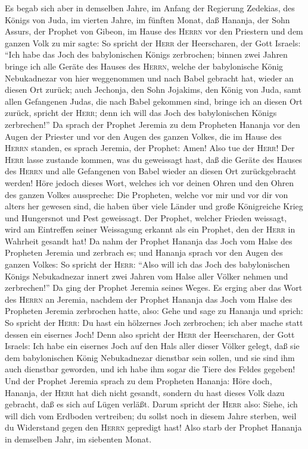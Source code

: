  Es begab sich aber in demselben Jahre, im Anfang der
Regierung Zedekias, des Königs von Juda, im vierten Jahre, im fünften
Monat, daß Hananja, der Sohn Assurs, der Prophet von Gibeon, im Hause
des \textsc{Herrn} vor den Priestern und dem ganzen Volk zu mir sagte:
 So spricht der \textsc{Herr} der Heerscharen, der Gott
Israels: ``Ich habe das Joch des babylonischen Königs zerbrochen;
 binnen zwei Jahren bringe ich alle Geräte des Hauses des
\textsc{Herrn}, welche der babylonische König Nebukadnezar von hier
weggenommen und nach Babel gebracht hat, wieder an diesen Ort zurück;
 auch Jechonja, den Sohn Jojakims, den König von Juda,
samt allen Gefangenen Judas, die nach Babel gekommen sind, bringe ich an
diesen Ort zurück, spricht der \textsc{Herr}; denn ich will das Joch des
babylonischen Königs zerbrechen!''  Da sprach der Prophet
Jeremia zu dem Propheten Hananja vor den Augen der Priester und vor den
Augen des ganzen Volkes, die im Hause des \textsc{Herrn} standen,
 es sprach Jeremia, der Prophet: Amen! Also tue der
\textsc{Herr}! Der \textsc{Herr} lasse zustande kommen, was du
geweissagt hast, daß die Geräte des Hauses des \textsc{Herrn} und alle
Gefangenen von Babel wieder an diesen Ort zurückgebracht werden!
 Höre jedoch dieses Wort, welches ich vor deinen Ohren und
den Ohren des ganzen Volkes ausspreche:  Die Propheten,
welche vor mir und vor dir von alters her gewesen sind, die haben über
viele Länder und große Königreiche Krieg und Hungersnot und Pest
geweissagt.  Der Prophet, welcher Frieden weissagt, wird
am Eintreffen seiner Weissagung erkannt als ein Prophet, den der
\textsc{Herr} in Wahrheit gesandt hat!  Da nahm der
Prophet Hananja das Joch vom Halse des Propheten Jeremia und zerbrach
es;  und Hananja sprach vor den Augen des ganzen Volkes:
So spricht der \textsc{Herr}: ``Also will ich das Joch des babylonischen
Königs Nebukadnezar innert zwei Jahren vom Halse aller Völker nehmen und
zerbrechen!'' Da ging der Prophet Jeremia seines Weges. 
Es erging aber das Wort des \textsc{Herrn} an Jeremia, nachdem der
Prophet Hananja das Joch vom Halse des Propheten Jeremia zerbrochen
hatte, also:  Gehe und sage zu Hananja und sprich: So
spricht der \textsc{Herr}: Du hast ein hölzernes Joch zerbrochen; ich
aber mache statt dessen ein eisernes Joch!  Denn also
spricht der \textsc{Herr} der Heerscharen, der Gott Israels: Ich habe
ein eisernes Joch auf den Hals aller dieser Völker gelegt, daß sie dem
babylonischen König Nebukadnezar dienstbar sein sollen, und sie sind ihm
auch dienstbar geworden, und ich habe ihm sogar die Tiere des Feldes
gegeben!  Und der Prophet Jeremia sprach zu dem Propheten
Hananja: Höre doch, Hananja, der \textsc{Herr} hat dich nicht gesandt,
sondern du hast dieses Volk dazu gebracht, daß es sich auf Lügen
verläßt.  Darum spricht der \textsc{Herr} also: Siehe,
ich will dich vom Erdboden vertreiben; du sollst noch in diesem Jahre
sterben, weil du Widerstand gegen den \textsc{Herrn} gepredigt hast!
 Also starb der Prophet Hananja in demselben Jahr, im
siebenten Monat.

